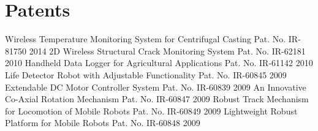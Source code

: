 \section{Patents}
\begin{cvhonors}
  \cvhonor
    {Wireless Temperature Monitoring System for Centrifugal Casting}
    {Pat. No. IR-81750}
    {}
    {2014}
  \cvhonor
    {2D Wireless Structural Crack Monitoring System}
    {Pat. No. IR-62181}
    {}
    {2010}
  \cvhonor
    {Handheld Data Logger for Agricultural Applications}
    {Pat. No. IR-61142}
    {}
    {2010}
  \cvhonor
    {Life Detector Robot with Adjustable Functionality}
    {Pat. No. IR-60845}
    {}
    {2009}
  \cvhonor
    {Extendable DC Motor Controller System}
    {Pat. No. IR-60839}
    {}
    {2009}
  \cvhonor
    {An Innovative Co-Axial Rotation Mechanism}
    {Pat. No. IR-60847}
    {}
    {2009}
  \cvhonor
    {Robust Track Mechanism for Locomotion of Mobile Robots}
    {Pat. No. IR-60849}
    {}
    {2009}
  \cvhonor
    {Lightweight Robust Platform for Mobile Robots}
    {Pat. No. IR-60848}
    {}
    {2009}
\end{cvhonors} 